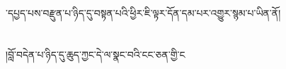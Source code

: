 ་དཔྱད་པས་བརྫུན་པ་ཉིད་དུ་བསྟན་པའི་ཕྱིར་ཇི་ལྟར་དོན་དམ་པར་འགྱུར་སྙམ་པ་ཡིན་ནོ།\chapter{ }།བློ་བདེན་པ་ཉིད་དུ་ཆུད་ཀྱང་དེ་ལ་སྣང་བའི་ངང་ཅན་གྱི་ང